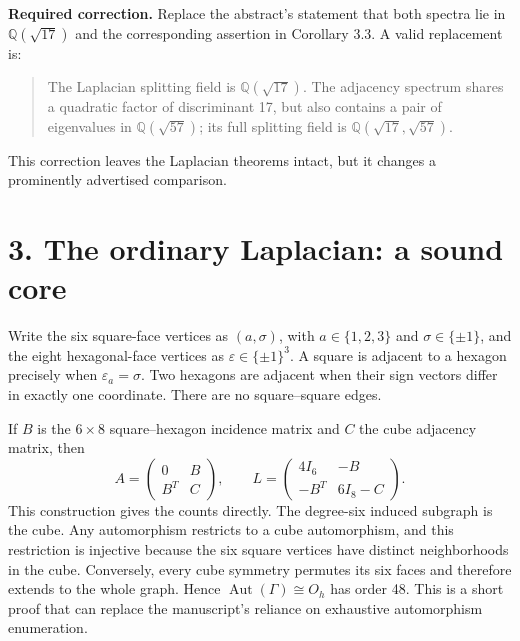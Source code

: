\documentclass[11pt,a4paper]{article}
\newcommand{\Q}{\mathbb Q}
\begin{document}
\textbf{Required correction.} Replace the abstract's statement that both spectra lie in $\Q(\sqrt{17})$ and the corresponding assertion in Corollary 3.3. A valid replacement is:
\begin{quote}
The Laplacian splitting field is $\Q(\sqrt{17})$. The adjacency spectrum shares a quadratic factor of discriminant 17, but also contains a pair of eigenvalues in $\Q(\sqrt{57})$; its full splitting field is $\Q(\sqrt{17},\sqrt{57})$.
\end{quote}
This correction leaves the Laplacian theorems intact, but it changes a prominently advertised comparison.

\section*{3. The ordinary Laplacian: a sound core}
Write the six square-face vertices as $(a,\sigma)$, with $a\in\{1,2,3\}$ and $\sigma\in\{\pm1\}$, and the eight hexagonal-face vertices as $\varepsilon\in\{\pm1\}^3$. A square is adjacent to a hexagon precisely when $\varepsilon_a=\sigma$. Two hexagons are adjacent when their sign vectors differ in exactly one coordinate. There are no square--square edges.

If $B$ is the $6\times8$ square--hexagon incidence matrix and $C$ the cube adjacency matrix, then
\begin{equation}
 A=\begin{pmatrix}0&B\\B^T&C\end{pmatrix},\qquad
 L=\begin{pmatrix}4I_6&-B\\-B^T&6I_8-C\end{pmatrix}.
\end{equation}
This construction gives the counts directly. The degree-six induced subgraph is the cube. Any automorphism restricts to a cube automorphism, and this restriction is injective because the six square vertices have distinct neighborhoods in the cube. Conversely, every cube symmetry permutes its six faces and therefore extends to the whole graph. Hence $\operatorname{Aut}(\Gamma)\cong O_h$ has order 48. This is a short proof that can replace the manuscript's reliance on exhaustive automorphism enumeration.
\end{document}
